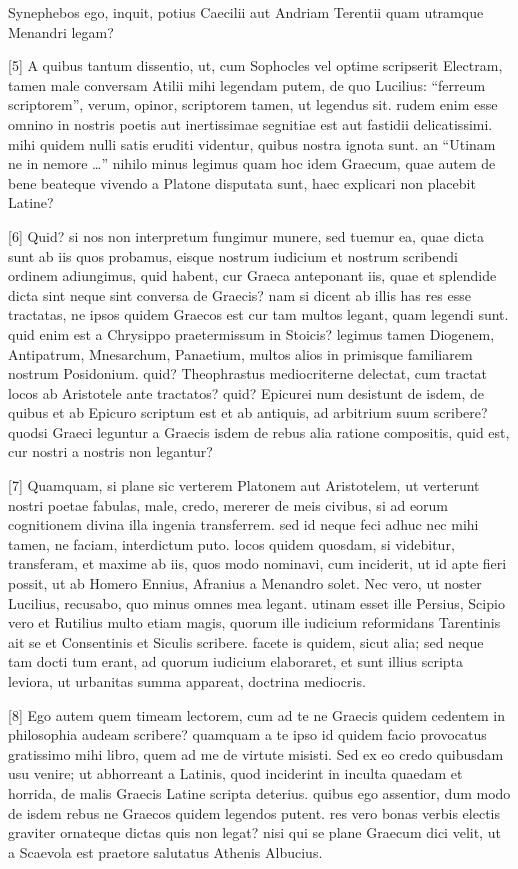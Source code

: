 \documentclass{article}
\begin{document}
Synephebos ego, inquit, potius Caecilii aut Andriam Terentii quam utramque Menandri legam?

[5] A quibus tantum dissentio, ut, cum Sophocles vel optime scripserit Electram, tamen male conversam Atilii mihi legendam putem, de quo Lucilius: ``ferreum scriptorem'', verum, opinor, scriptorem tamen, ut legendus sit. rudem enim esse omnino in nostris poetis aut inertissimae segnitiae est aut fastidii delicatissimi. mihi quidem nulli satis eruditi videntur, quibus nostra ignota sunt. an ``Utinam ne in nemore \ldots'' nihilo minus legimus quam hoc idem Graecum, quae autem de bene beateque vivendo a Platone disputata sunt, haec explicari non placebit Latine?

[6] Quid? si nos non interpretum fungimur munere, sed tuemur ea, quae dicta sunt ab iis quos probamus, eisque nostrum iudicium et nostrum scribendi ordinem adiungimus, quid habent, cur Graeca anteponant iis, quae et splendide dicta sint neque sint conversa de Graecis? nam si dicent ab illis has res esse tractatas, ne ipsos quidem Graecos est cur tam multos legant, quam legendi sunt. quid enim est a Chrysippo praetermissum in Stoicis? legimus tamen Diogenem, Antipatrum, Mnesarchum, Panaetium, multos alios in primisque familiarem nostrum Posidonium. quid? Theophrastus mediocriterne delectat, cum tractat locos ab Aristotele ante tractatos? quid? Epicurei num desistunt de isdem, de quibus et ab Epicuro scriptum est et ab antiquis, ad arbitrium suum scribere? quodsi Graeci leguntur a Graecis isdem de rebus alia ratione compositis, quid est, cur nostri a nostris non legantur?

[7] Quamquam, si plane sic verterem Platonem aut Aristotelem, ut verterunt nostri poetae fabulas, male, credo, mererer de meis civibus, si ad eorum cognitionem divina illa ingenia transferrem. sed id neque feci adhuc nec mihi tamen, ne faciam, interdictum puto. locos quidem quosdam, si videbitur, transferam, et maxime ab iis, quos modo nominavi, cum inciderit, ut id apte fieri possit, ut ab Homero Ennius, Afranius a Menandro solet. Nec vero, ut noster Lucilius, recusabo, quo minus omnes mea legant. utinam esset ille Persius, Scipio vero et Rutilius multo etiam magis, quorum ille iudicium reformidans Tarentinis ait se et Consentinis et Siculis scribere. facete is quidem, sicut alia; sed neque tam docti tum erant, ad quorum iudicium elaboraret, et sunt illius scripta leviora, ut urbanitas summa appareat, doctrina mediocris.

[8] Ego autem quem timeam lectorem, cum ad te ne Graecis quidem cedentem in philosophia audeam scribere? quamquam a te ipso id quidem facio provocatus gratissimo mihi libro, quem ad me de virtute misisti. Sed ex eo credo quibusdam usu venire; ut abhorreant a Latinis, quod inciderint in inculta quaedam et horrida, de malis Graecis Latine scripta deterius. quibus ego assentior, dum modo de isdem rebus ne Graecos quidem legendos putent. res vero bonas verbis electis graviter ornateque dictas quis non legat? nisi qui se plane Graecum dici velit, ut a Scaevola est praetore salutatus Athenis Albucius.
\end{document}
